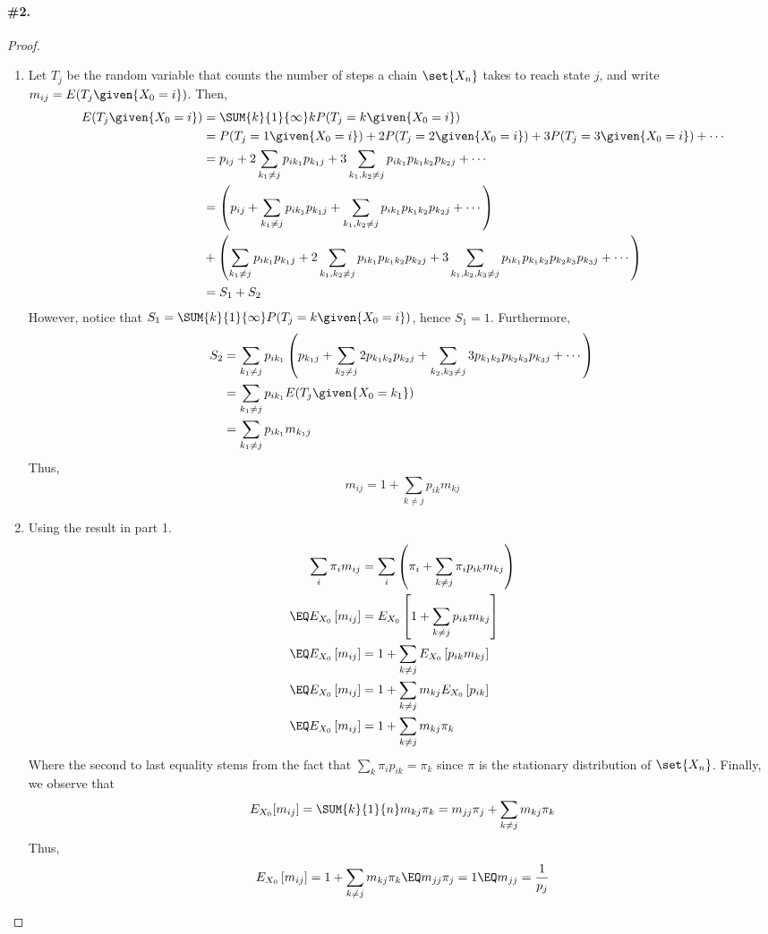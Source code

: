 \documentclass[12pt,titlepage]{article}
\begin{document}
\paragraph{\#2.}
\begin{proof}
\begin{enumerate}
\item Let $T_j$ be the random variable that counts the number of steps a chain $\set{X_n}$ takes to reach state $j$, and write $m_{ij} = E(T_j \given{X_0 = i})$. Then,
\begin{align*}
E(T_j \given{X_0=i}) &= \SUM{k}{1}{\infty} k P(T_j = k\given{X_0=i}) \\
&= P(T_j = 1\given{X_0 = i}) + 2 P(T_j =2 \given{X_0=i}) + 3 P(T_j = 3 \given{X_0 = i}) + \cdots \\%
&= p_{ij} + 2\sum_{k_1 \neq j} p_{i k_1}p_{k_1 j} + 3 \sum_{k_1,k_2 \neq j} p_{i k_1}p_{k_1 k_2} p_{k_2 j} + \cdots \\
&= \left(p_{ij} + \sum_{k_1 \neq j} p_{i k_1}p_{k_1 j} +  \sum_{k_1,k_2 \neq j} p_{i k_1}p_{k_1 k_2} p_{k_2 j} + \cdots \right)  \\
&+ \left( \sum_{k_1 \neq j} p_{i k_1}p_{k_1 j} +  2 \sum_{k_1,k_2 \neq j} p_{i k_1}p_{k_1 k_2} p_{k_2 j} + 3 \sum_{k_1,k_2,k_3\neq j}p_{i k_1}p_{k_1 k_2} p_{k_2 k_3} p_{k_3 j} + \cdots \right) \\
&= S_1 + S_2
\end{align*}
However, notice that $S_1 = \SUM{k}{1}{\infty} P(T_j = k \given{X_0 = i})$, hence $S_1 = 1$. Furthermore, 
\begin{align*}
S_2 &= \sum_{k_1 \neq j} p_{i k_1}\left( p_{k_1 j} +  \sum_{k_2 \neq j} 2 p_{k_1 k_2} p_{k_2 j} + \sum_{k_2,k_3\neq j}3 p_{k_1 k_2} p_{k_2 k_3} p_{k_3 j} + \cdots \right) \\
&= \sum_{k_1 \neq j} p_{i k_1} E(T_j \given{X_0 = k_1}) \\
&= \sum_{k_1 \neq j} p_{i k_1} m_{k_1 j}
\end{align*}
Thus,
\[
m_{ij} = 1 + \sum_{k\neq j} p_{ik} m_{kj}
\]
\item Using the result in part 1.
\begin{align*} %
\sum_{i} \pi_i m_{ij} &= \sum_{i}\left( \pi_{i} + \sum_{k\neq j} \pi_i p_{ik}m_{kj}\right) \\
\EQ E_{X_0}\left[m_{ij}\right]&= E_{X_0}\left[1 +\sum_{k\neq j} p_{ik}m_{kj}\right] \\
\EQ E_{X_0}\left[m_{ij}\right] &= 1 + \sum_{k\neq j}  E_{X_0}\left[p_{ik}m_{kj}\right] \\
\EQ  E_{X_0}\left[m_{ij}\right] &= 1 + \sum_{k\neq j} m_{kj} E_{X_0}\left[p_{ik}\right] \\
\EQ  E_{X_0}\left[m_{ij}\right] &= 1 + \sum_{k\neq j} m_{kj}\pi_k
\end{align*}
Where the second to last equality stems from the fact that $\sum_{k} \pi_{i}p_{ik} = \pi_k$ since $\pi$ is the stationary distribution of $\set{X_n}$. Finally, we observe that \[E_{X_0}[m_{ij}] = \SUM{k}{1}{n} m_{kj}\pi_k = m_{jj} \pi_{j} + \sum_{k\neq j} m_{kj} \pi_k\] Thus,
\[
 E_{X_0}\left[m_{ij}\right] = 1 + \sum_{k\neq j} m_{kj}\pi_k  \EQ m_{jj} \pi_j = 1 \EQ m_{jj} = \frac{1}{p_j}
\]


\end{enumerate}
\end{proof}
\end{document}
